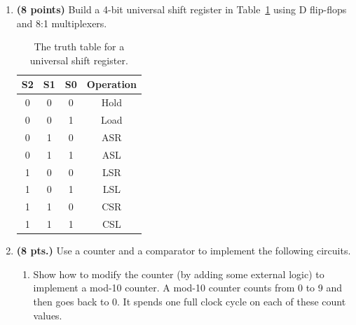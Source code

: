 \begin{enumerate}
\item {\bf (8 points)} Build a 4-bit universal shift register in
Table~\ref{table:uni} using D flip-flops and 8:1 multiplexers.

\begin{table}
\begin{tabular}{c|c|c||c}
S2 & S1 & S0 & Operation \\ \hline
0  &  0 &  0 & Hold \\ \hline
0  &  0 &  1 & Load \\ \hline
0  &  1 &  0 & ASR  \\ \hline
0  &  1 &  1 & ASL  \\ \hline
1  &  0 &  0 & LSR  \\ \hline
1  &  0 &  1 & LSL  \\ \hline
1  &  1 &  0 & CSR  \\ \hline
1  &  1 &  1 & CSL  \\ 
\end{tabular}
\caption{The truth table for a universal shift register.}
\label{table:uni}
\end{table}

\begin{solution}{
\begin{figure}[ht]
\end{figure}
}\end{solution}

\item {\bf (8 pts.)} Use a counter and a comparator
to implement the following circuits.

\begin{enumerate}
\item Show how to modify the counter (by adding some external logic)
to implement a mod-10 counter.  A mod-10 counter counts from 0 to
9 and then goes back to 0.  It spends one full clock cycle on each
of these count values.


\end{enumerate}
\end{enumerate}
